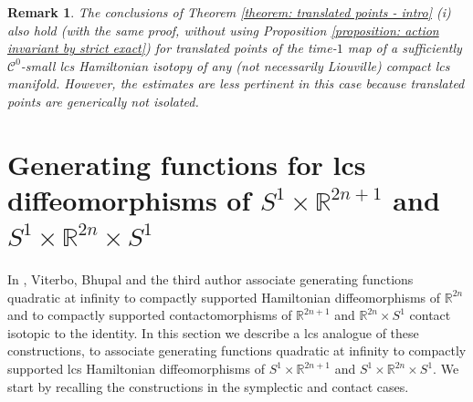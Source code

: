 \documentclass{amsart}
\newtheorem{remark}[thm]{Remark}
\theoremstyle{remark}
\begin{document}
\begin{remark}
The conclusions of Theorem \ref{theorem: translated points - intro} (i)
also hold (with the same proof,
without using Proposition \ref{proposition: action invariant by strict exact})
for translated points of the time-$1$ map
of a sufficiently $\mathcal{C}^0$-small
lcs Hamiltonian isotopy
of any (not necessarily Liouville) compact lcs manifold.
However,
the estimates are less pertinent in this case
because translated points are generically not isolated.
\end{remark} 


\section{Generating functions for lcs diffeomorphisms of $S^1 \times \mathbb{R}^{2n+1}$
and $S^1 \times \mathbb{R}^{2n} \times S^1$}\label{section: lcs product etc}

In \cite{Viterbo, Bhupal, San11},
Viterbo, Bhupal and the third author
associate generating functions quadratic at infinity
to compactly supported Hamiltonian diffeomorphisms of $\mathbb{R}^{2n}$
and to compactly supported contactomorphisms
of $\mathbb{R}^{2n+1}$ and $\mathbb{R}^{2n} \times S^1$
contact isotopic to the identity.
In this section we describe a lcs analogue of these constructions,
to associate generating functions quadratic at infinity
to compactly supported lcs Hamiltonian diffeomorphisms
of $S^1 \times \mathbb{R}^{2n+1}$ and $S^1 \times \mathbb{R}^{2n} \times S^1$.
We start by recalling the constructions
in the symplectic and contact cases.
\end{document}
